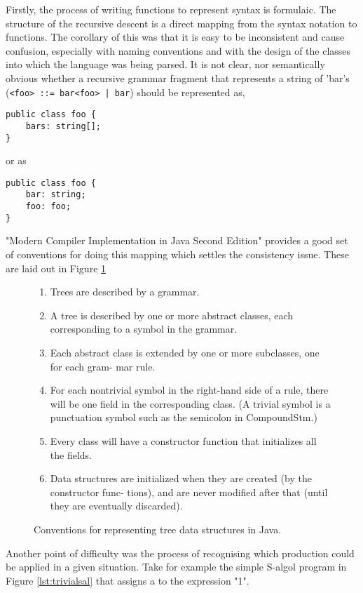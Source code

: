 \documentclass{article}
\begin{document}
Firstly, the process of writing functions to represent syntax is formulaic. The structure of the recursive descent is a direct mapping from the syntax notation to functions. The corollary of this was that it is easy to be inconsistent and cause confusion, especially with naming conventions and with the design of the classes into which the language was being parsed. It is not clear, nor semantically obvious whether a recursive grammar fragment that represents a string of 'bar's (\lstinline{<foo> ::= bar<foo> | bar}) should be represented as,

\begin{lstlisting}
public class foo {
	bars: string[];
}
\end{lstlisting}

or as 

\begin{lstlisting}
public class foo {
	bar: string;
	foo: foo;
}
\end{lstlisting}


"Modern Compiler Implementation in Java Second Edition" provides a good set of conventions for doing this mapping which settles the consistency issue. These are laid out in Figure \ref{fig:classMapping}


\begin{figure}
\begin{enumerate}
\item Trees are described by a grammar.
\item A tree is described by one or more abstract classes, each corresponding to a
symbol in the grammar.
\item Each abstract class is extended by one or more subclasses, one for each gram-
mar rule.
\item For each nontrivial symbol in the right-hand side of a rule, there will be one field in the corresponding class. (A trivial symbol is a punctuation symbol such as the semicolon in CompoundStm.)
\item Every class will have a constructor function that initializes all the fields.
\item Data structures are initialized when they are created (by the constructor func-
tions), and are never modified after that (until they are eventually discarded).
\end{enumerate}
\caption{Conventions for representing tree data structures in Java. \cite{11270520020101}}
\label{fig:classMapping}
\end{figure}

Another point of difficulty was the process of recognising which production could be applied in a given situation. Take for example the simple S-algol program in Figure \ref{lst:trivialsal} that assigns a to the expression "1".
\end{document}
